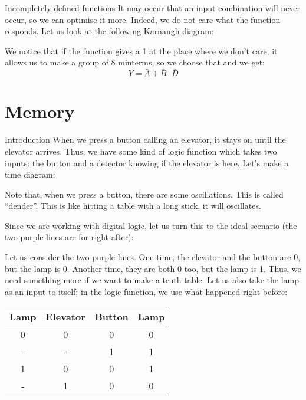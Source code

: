 \documentclass[a4paper]{article}
\begin{document}
\begin{parag}{Incompletely defined functions}
    It may occur that an input combination will never occur, so we can optimise it more. Indeed, we do not care what the function responds. Let us look at the following Karnaugh diagram:

    We notice that if the function gives a 1 at the place where we don't care, it allows us to make a group of 8 minterms, so we choose that and we get: 
    \[Y = \bar{A} + \bar{B} \cdot \bar{D}\]
\end{parag}

\section{Memory}
\begin{parag}{Introduction}
    When we press a button calling an elevator, it stays on until the elevator arrives. Thus, we have some kind of logic function which takes two inputs: the button and a detector knowing if the elevator is here. Let's make a time diagram:

    Note that, when we press a button, there are some oscillations. This is called ``dender''. This is like hitting a table with a long stick, it will oscillates. 

    Since we are working with digital logic, let us turn this to the ideal scenario (the two purple lines are for right after):

    Let us consider the two purple lines. One time, the elevator and the button are 0, but the lamp is 0. Another time, they are both 0 too, but the lamp is 1. Thus, we need something more if we want to make a truth table. Let us also take the lamp as an input to itself; in the logic function, we use what happened right before:
    \begin{center}
    \begin{tabular}{ccc|c}
        Lamp & Elevator & Button & Lamp \\
        \hline
        0 & 0 & 0 & 0 \\
        - & - & 1 & 1 \\
        1 & 0 & 0 & 1 \\
        - & 1 & 0 & 0 \\
    \end{tabular}
    \end{center}
    

\end{parag}
\end{document}
